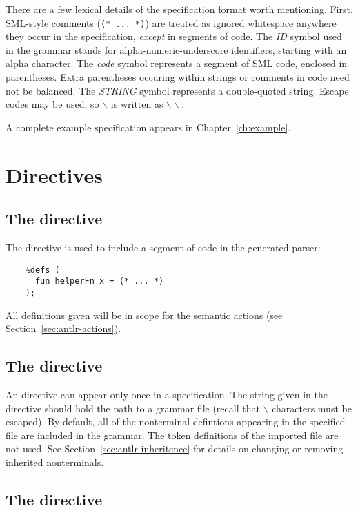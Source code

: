 There are a few lexical details of the specification format worth mentioning.  First, SML-style comments (\texttt{(* ... *)}) are treated as ignored whitespace anywhere they occur in the specification, \emph{except} in segments of code.  The \textit{ID} symbol used in the grammar stands for alpha-numeric-underscore identifiers, starting with an alpha character.  The \textit{code} symbol represents a segment of SML code, enclosed in parentheses.  Extra parentheses occuring within strings or comments in code need not be balanced.  The \textit{STRING} symbol represents a double-quoted string.  Escape codes may be used, so $\backslash$ is written as $\backslash\backslash$.

A complete example specification appears in Chapter~\ref{ch:example}.

\section{Directives}

\subsection{The  directive}

The  directive is used to include a segment of code in the generated parser:  
\begin{verbatim}
    %defs (
      fun helperFn x = (* ... *)
    );
\end{verbatim}
All definitions given will be in scope for the semantic actions (see Section~\ref{sec:antlr-actions}).

\subsection{The  directive}

An  directive can appear only once in a specification.  The string given in the directive should hold the path to a grammar file (recall that $\backslash$ characters must be escaped).  By default, all of the nonterminal defintions appearing in the specified file are included in the grammar.  The token definitions of the imported file are not used.  See Section~\ref{sec:antlr-inheritence} for details on changing or removing inherited nonterminals.

\subsection{The  directive}

